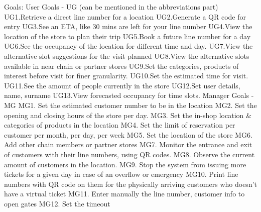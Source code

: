 Goals:
      User Goals - UG (can be mentioned in the abbreviations part)
      UG1.Retrieve a direct line number for a location
      UG2.Generate a QR code for entry
      UG3.See an ETA, like 30 mins are left for your line number
      UG4.View the location of the store to plan their trip
      UG5.Book a future line number for a day
      UG6.See the occupancy of the location for different time and day.
      UG7.View the alternative slot suggestions for the visit planned
      UG8.View the alternative slots available in near chain or partner stores
      UG9.Set the categories, products of interest before visit for finer granularity.
      UG10.Set the estimated time for visit.
      UG11.See the amount of people currently in the store
      UG12.Set user details, name, surname
      UG13.View forecasted occupancy for time slots.
      Manager Goals - MG
      MG1. Set the estimated customer number to be in the location
      MG2. Set the opening and closing hours of the store per day.
      MG3. Set the in-shop location & categories of products in the location
      MG4. Set the limit of reservation per customer per month, per day, per week
      MG5. Set the location of the store
      MG6. Add other chain members or partner stores
      MG7. Monitor the entrance and exit of customers with their line numbers, using QR codes.
      MG8. Observe the current amount of customers in the location.
      MG9. Stop the system from issuing more tickets for a given day in case of an overflow or emergency
      MG10. Print line numbers with QR code on them for the physically arriving customers who doesn't have a virtual ticket
      MG11. Enter manually the line number, customer info to open gates
      MG12. Set the timeout



